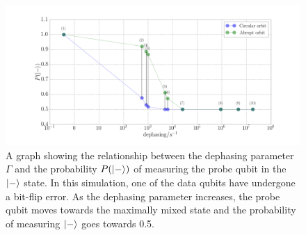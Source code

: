 \fi



\begin{figure}[h]
	\centering
	\includegraphics[width=\textwidth]{../Figures/dephasing_plot.png}
		\caption{A graph showing the relationship between the dephasing parameter $\Gamma$ and the probability $P(\ket{-})$ of measuring the probe qubit in the $\ket{-}$ state. In this simulation, one of the data qubits have undergone a bit-flip error. As the dephasing parameter increases, the probe qubit moves towards the maximally mixed state and the probability of measuring $\ket{-}$ goes towards 0.5.}
		\label{fig:phaseplot}
\end{figure}





